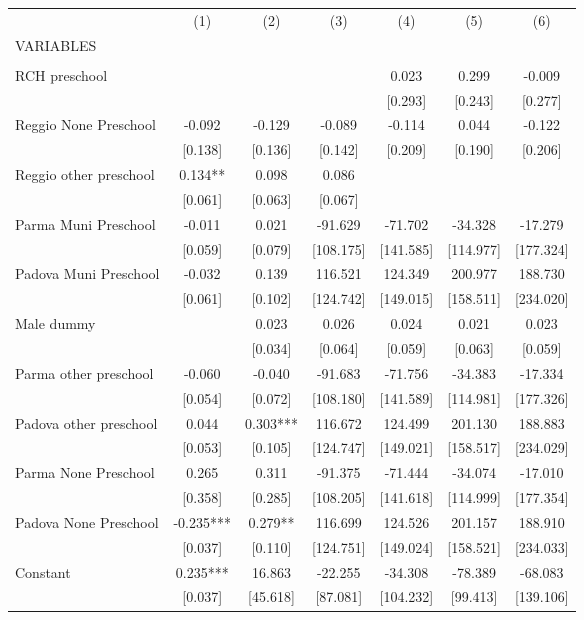 \begin{tabular}{lcccccc} \hline
 & (1) & (2) & (3) & (4) & (5) & (6) \\
VARIABLES &  &  &  &  &  &  \\ \hline
 &  &  &  &  &  &  \\
RCH preschool &  &  &  & 0.023 & 0.299 & -0.009 \\
 &  &  &  & [0.293] & [0.243] & [0.277] \\
Reggio None Preschool & -0.092 & -0.129 & -0.089 & -0.114 & 0.044 & -0.122 \\
 & [0.138] & [0.136] & [0.142] & [0.209] & [0.190] & [0.206] \\
Reggio other preschool & 0.134** & 0.098 & 0.086 &  &  &  \\
 & [0.061] & [0.063] & [0.067] &  &  &  \\
Parma Muni Preschool & -0.011 & 0.021 & -91.629 & -71.702 & -34.328 & -17.279 \\
 & [0.059] & [0.079] & [108.175] & [141.585] & [114.977] & [177.324] \\
Padova Muni Preschool & -0.032 & 0.139 & 116.521 & 124.349 & 200.977 & 188.730 \\
 & [0.061] & [0.102] & [124.742] & [149.015] & [158.511] & [234.020] \\
Male dummy &  & 0.023 & 0.026 & 0.024 & 0.021 & 0.023 \\
 &  & [0.034] & [0.064] & [0.059] & [0.063] & [0.059] \\
Parma other preschool & -0.060 & -0.040 & -91.683 & -71.756 & -34.383 & -17.334 \\
 & [0.054] & [0.072] & [108.180] & [141.589] & [114.981] & [177.326] \\
Padova other preschool & 0.044 & 0.303*** & 116.672 & 124.499 & 201.130 & 188.883 \\
 & [0.053] & [0.105] & [124.747] & [149.021] & [158.517] & [234.029] \\
Parma None Preschool & 0.265 & 0.311 & -91.375 & -71.444 & -34.074 & -17.010 \\
 & [0.358] & [0.285] & [108.205] & [141.618] & [114.999] & [177.354] \\
Padova None Preschool & -0.235*** & 0.279** & 116.699 & 124.526 & 201.157 & 188.910 \\
 & [0.037] & [0.110] & [124.751] & [149.024] & [158.521] & [234.033] \\
Constant & 0.235*** & 16.863 & -22.255 & -34.308 & -78.389 & -68.083 \\
 & [0.037] & [45.618] & [87.081] & [104.232] & [99.413] & [139.106] \\

\end{tabular}
